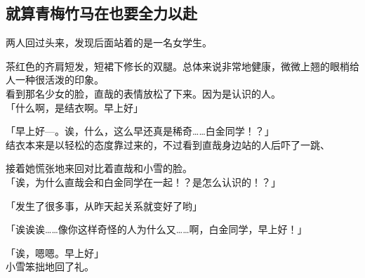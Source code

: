 \subsection{就算青梅竹马在也要全力以赴}

两人回过头来，发现后面站着的是一名女学生。

茶红色的齐肩短发，短裙下修长的双腿。总体来说非常地健康，微微上翘的眼梢给人一种很活泼的印象。\\

看到那名少女的脸，直哉的表情放松了下来。因为是认识的人。\\

「什么啊，是结衣啊。早上好」

「早上好—。诶，什么，这么早还真是稀奇……白金同学！？」\\

结衣本来是以轻松的态度靠过来的，不过看到直哉身边站的人后吓了一跳、

接着她慌张地来回对比着直哉和小雪的脸。\\

「诶，为什么直哉会和白金同学在一起！？是怎么认识的！？」

「发生了很多事，从昨天起关系就变好了哟」

「诶诶诶……像你这样奇怪的人为什么又……啊，白金同学，早上好！」

「诶，嗯嗯。早上好」\\

小雪笨拙地回了礼。


